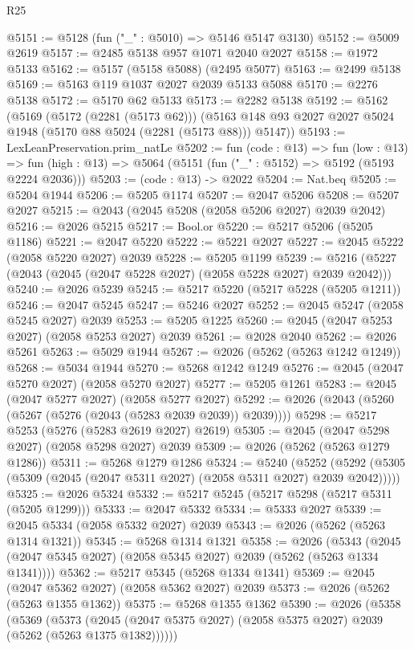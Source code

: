 \begin{lexlean}{R25}
\begin{coremodule}
@5151 := @5128 (fun ("_" : @5010) => @5146 @5147 @3130)
@5152 := @5009 @2619
@5157 := @2485 @5138 @957 @1071 @2040 @2027
@5158 := @1972 @5133
@5162 := @5157 (@5158 @5088) (@2495 @5077)
@5163 := @2499 @5138
@5169 := @5163 @119 @1037 @2027 @2039 @5133 @5088
@5170 := @2276 @5138
@5172 := @5170 @62 @5133
@5173 := @2282 @5138
@5192 := @5162
    (@5169
      (@5172 (@2281 (@5173 @62)))
      (@5163 @148 @93 @2027 @2027 @5024 @1948 (@5170 @88 @5024 (@2281 (@5173 @88))) @5147))
@5193 := LexLeanPreservation.prim_natLe
@5202 := fun (code : @13) =>
  fun (low : @13) =>
  fun (high : @13) => @5064 (@5151 (fun ("_" : @5152) => @5192 (@5193 @2224 @2036)))
@5203 := (code : @13) -> @2022
@5204 := Nat.beq
@5205 := @5204 @1944
@5206 := @5205 @1174
@5207 := @2047 @5206
@5208 := @5207 @2027
@5215 := @2043 (@2045 @5208 (@2058 @5206 @2027) @2039 @2042)
@5216 := @2026 @5215
@5217 := Bool.or
@5220 := @5217 @5206 (@5205 @1186)
@5221 := @2047 @5220
@5222 := @5221 @2027
@5227 := @2045 @5222 (@2058 @5220 @2027) @2039
@5228 := @5205 @1199
@5239 := @5216 (@5227 (@2043 (@2045 (@2047 @5228 @2027) (@2058 @5228 @2027) @2039 @2042)))
@5240 := @2026 @5239
@5245 := @5217 @5220 (@5217 @5228 (@5205 @1211))
@5246 := @2047 @5245
@5247 := @5246 @2027
@5252 := @2045 @5247 (@2058 @5245 @2027) @2039
@5253 := @5205 @1225
@5260 := @2045 (@2047 @5253 @2027) (@2058 @5253 @2027) @2039
@5261 := @2028 @2040
@5262 := @2026 @5261
@5263 := @5029 @1944
@5267 := @2026 (@5262 (@5263 @1242 @1249))
@5268 := @5034 @1944
@5270 := @5268 @1242 @1249
@5276 := @2045 (@2047 @5270 @2027) (@2058 @5270 @2027)
@5277 := @5205 @1261
@5283 := @2045 (@2047 @5277 @2027) (@2058 @5277 @2027)
@5292 := @2026 (@2043 (@5260 (@5267 (@5276 (@2043 (@5283 @2039 @2039)) @2039))))
@5298 := @5217 @5253 (@5276 (@5283 @2619 @2027) @2619)
@5305 := @2045 (@2047 @5298 @2027) (@2058 @5298 @2027) @2039
@5309 := @2026 (@5262 (@5263 @1279 @1286))
@5311 := @5268 @1279 @1286
@5324 := @5240
    (@5252 (@5292 (@5305 (@5309 (@2045 (@2047 @5311 @2027) (@2058 @5311 @2027) @2039 @2042)))))
@5325 := @2026 @5324
@5332 := @5217 @5245 (@5217 @5298 (@5217 @5311 (@5205 @1299)))
@5333 := @2047 @5332
@5334 := @5333 @2027
@5339 := @2045 @5334 (@2058 @5332 @2027) @2039
@5343 := @2026 (@5262 (@5263 @1314 @1321))
@5345 := @5268 @1314 @1321
@5358 := @2026
    (@5343 (@2045 (@2047 @5345 @2027) (@2058 @5345 @2027) @2039 (@5262 (@5263 @1334 @1341))))
@5362 := @5217 @5345 (@5268 @1334 @1341)
@5369 := @2045 (@2047 @5362 @2027) (@2058 @5362 @2027) @2039
@5373 := @2026 (@5262 (@5263 @1355 @1362))
@5375 := @5268 @1355 @1362
@5390 := @2026
    (@5358
      (@5369
        (@5373 (@2045 (@2047 @5375 @2027) (@2058 @5375 @2027) @2039 (@5262 (@5263 @1375 @1382))))))

\end{coremodule}
\end{lexlean}
